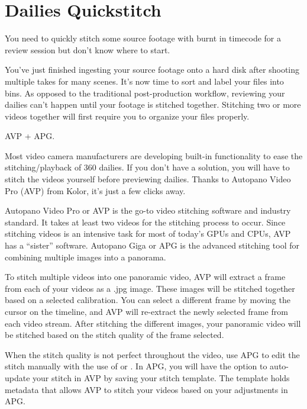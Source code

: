 \chapter{Dailies Quickstitch}
\pagecolor{white}
\label{chap:30}
\begin{fullwidth}

\problem

{\large You need to quickly stitch some source footage with burnt in timecode for a review session but don't know where to start. \par}

You've just finished ingesting your source footage onto a hard disk after shooting multiple takes for many scenes. It's now time to sort and label your files into bins. As opposed to the traditional post-production workflow, reviewing your dailies can't happen until your footage is stitched together. Stitching two or more videos together will first require you to organize your files properly.

\solution

{\large AVP + APG. \par}

Most video camera manufacturers are developing built-in functionality to ease the stitching/playback of 360 dailies. If you don't have a \textbf{} solution, you will have to stitch the videos yourself before previewing dailies. Thanks to Autopano Video Pro (AVP) from Kolor, it's just a few clicks away.

Autopano Video Pro or AVP is the go-to video stitching software and industry standard. It takes at least two videos for the stitching process to occur. Since stitching videos is an intensive task for most of today’s GPUs and CPUs, AVP has a “sister” software. Autopano Giga or APG is the advanced stitching tool for combining multiple images into a panorama. 

To stitch multiple videos into one panoramic video, AVP will extract a frame from each of your videos as a .jpg image. These images will be stitched together based on a selected calibration. You can select a different frame by moving the cursor on the timeline, and AVP will re-extract the newly selected frame from each video stream. After stitching the different images, your panoramic video will be stitched based on the stitch quality of the frame selected. 


When the stitch quality is not perfect throughout the video, use APG to edit the stitch manually with the use of \textbf{} or \textbf{}. In APG, you will have the option to auto-update your stitch in AVP by saving your stitch template. The template holds metadata that allows AVP to stitch your videos based on your adjustments in APG.


\end{fullwidth}
